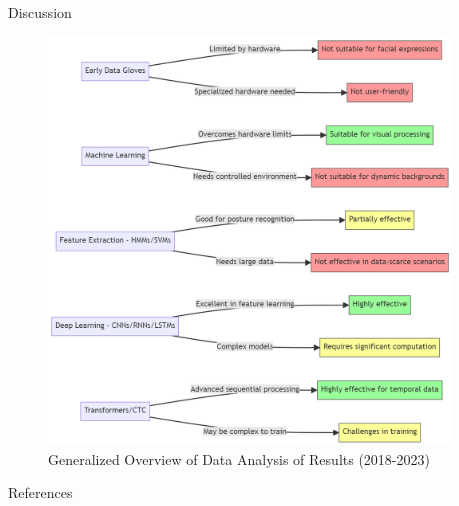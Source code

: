 \documentclass{beamer} %
\begin{document}
\begin{frame}[t]
\begin{columns}[t]
\begin{column}{0.3\textwidth}
			\begin{block}{Discussion}
				\begin{figure}
					\includegraphics[width=0.95\linewidth]{mermaid-diagram-discussion.png}
					\caption{Generalized Overview of Data Analysis of Results (2018-2023)}
				\end{figure}
			\end{block}


			\begin{block}{References}
				\fontsize{6}{10}\selectfont
				\vspace{-1ex} %
				
				
			\end{block}


		\end{column}

		\begin{column}{0.005\textwidth}\end{column} %


\end{columns}
\end{frame}
\end{document}
